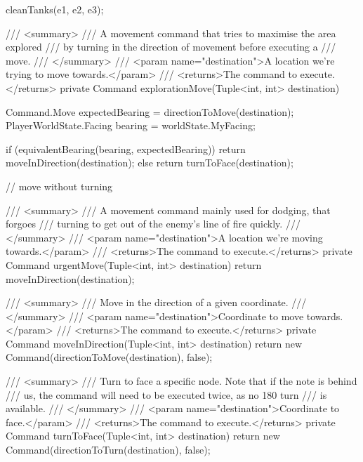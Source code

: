 \documentclass[11pt]{article}
\begin{document}
\begin{code}
{{{            cleanTanks(e1, e2, e3);
         }

        /// <summary>
        /// A movement command that tries to maximise the area explored
        /// by turning in the direction of movement before executing a
        /// move.
        /// </summary>
        /// <param name="destination">A location we're trying to move towards.</param>
        /// <returns>The command to execute.</returns>
        private Command explorationMove(Tuple<int, int> destination)
        {
            Command.Move expectedBearing = directionToMove(destination);
            PlayerWorldState.Facing bearing = worldState.MyFacing;

            if (equivalentBearing(bearing, expectedBearing))
            {
                return moveInDirection(destination);
            }
            else
            {
                return turnToFace(destination);
            }
        }

        // move without turning

        /// <summary>
        /// A movement command mainly used for dodging, that forgoes
        /// turning to get out of the enemy's line of fire quickly.
        /// </summary>
        /// <param name="destination">A location we're moving towards.</param>
        /// <returns>The command to execute.</returns>
        private Command urgentMove(Tuple<int, int> destination)
        {
            return moveInDirection(destination);
        }

        /// <summary>
        /// Move in the direction of a given coordinate.
        /// </summary>
        /// <param name="destination">Coordinate to move towards.</param>
        /// <returns>The command to execute.</returns>
        private Command moveInDirection(Tuple<int, int> destination)
        {
            return new Command(directionToMove(destination), false);
        }

        /// <summary>
        /// Turn to face a specific node. Note that if the note is behind
        /// us, the command will need to be executed twice, as no 180 turn
        /// is available.
        /// </summary>
        /// <param name="destination">Coordinate to face.</param>
        /// <returns>The command to execute.</returns>
        private Command turnToFace(Tuple<int, int> destination)
        {
            return new Command(directionToTurn(destination), false);
        }

}}
\end{code}
\end{document}
